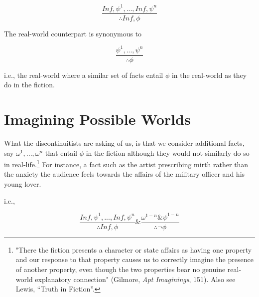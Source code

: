 \documentclass[phdthesis,12pt,final]{wuthesis}
\theoremstyle{definition}
\theoremstyle{definition}
\theoremstyle{definition}
\theoremstyle{definition}
\theoremstyle{remark}
\begin{document}
\[\frac{In f, \psi^{1}, . . ., In f, \psi^{n}}{\therefore In f, \phi}\]

\noindent The real-world counterpart is synonymous to

\[\frac{\psi^{1}, . . ., \psi^{n}}{\therefore\phi}\]

\noindent i.e., the real-world where a similar set of facts entail \(\phi\) in the real-world as they do in the fiction.

\section{Imagining Possible Worlds}\label{imagining-possible-worlds}

What the discontinuitists are asking of us, is that we consider additional facts, say \(\omega^{1}, . . ., \omega^{n}\) that entail \(\phi\) in the fiction although they would not similarly do so in real-life.\footnote{"There the fiction presents a character or state affairs as having one property and our response to that property causes us to correctly imagine the presence of another property, even though the two properties bear no genuine real-world explanatory connection" (Gilmore, \emph{Apt {Imaginings}}, 151). Also see Lewis, {``Truth in {Fiction}''}.} For instance, a fact such as the artist prescribing mirth rather than the anxiety the audience feels towards the affairs of the military officer and his young lover.

\noindent i.e.,

\[\frac{In f, \psi^{1}, . . ., In f, \psi^{n}}{\therefore In f, \phi} \& \frac{\omega^{1-n} \& \psi^{1-n}}{\therefore\neg\phi}\]
\end{document}

